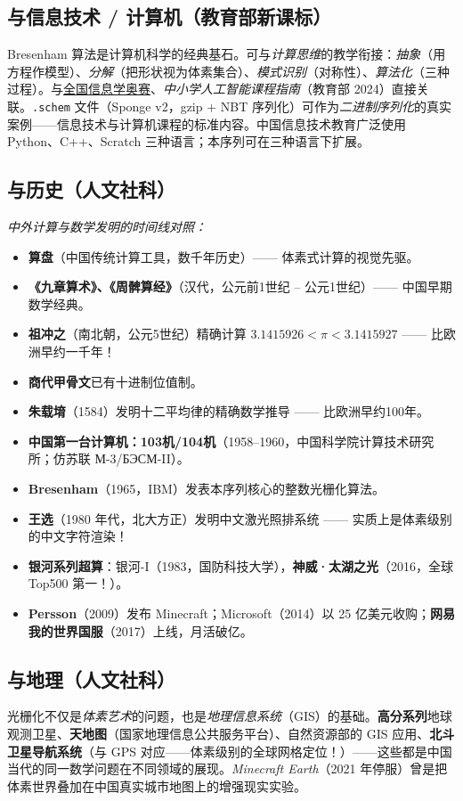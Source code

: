 \documentclass[12pt,a4paper]{scrartcl}
\newcommand{\acc}[1]{\textcolor{accent}{\textbf{#1}}}
\begin{document}
\subsection{与信息技术 / 计算机（教育部新课标）}
Bresenham 算法是计算机科学的经典基石。可与\emph{计算思维}的教学衔接：\emph{抽象}（用方程作模型）、\emph{分解}（把形状视为体素集合）、\emph{模式识别}（对称性）、\emph{算法化}（三种过程）。与\hyperref[sec:obmep]{全国信息学奥赛}、\emph{中小学人工智能课程指南}（教育部 2024）直接关联。\texttt{.schem} 文件（Sponge v2，gzip + NBT 序列化）可作为\emph{二进制序列化}的真实案例——信息技术与计算机课程的标准内容。中国信息技术教育广泛使用 Python、C++、Scratch 三种语言；本序列可在三种语言下扩展。

\subsection{与历史（人文社科）}
\emph{中外计算与数学发明的时间线对照：}
\begin{itemize}[leftmargin=1.3em,itemsep=0.15em,topsep=0.3em,nosep]
  \item \acc{算盘}（中国传统计算工具，数千年历史）—— 体素式计算的视觉先驱。
  \item \acc{《九章算术》、《周髀算经》}（汉代，公元前1世纪 -- 公元1世纪）—— 中国早期数学经典。
  \item \acc{祖冲之}（南北朝，公元5世纪）精确计算 $3.1415926 < \pi < 3.1415927$ —— 比欧洲早约一千年！
  \item \acc{商代甲骨文}已有十进制位值制。
  \item \acc{朱载堉}（1584）发明十二平均律的精确数学推导 —— 比欧洲早约100年。
  \item \acc{中国第一台计算机：103机/104机}（1958--1960，中国科学院计算技术研究所；仿苏联 М-3/БЭСМ-II）。
  \item \acc{Bresenham}（1965，IBM）发表本序列核心的整数光栅化算法。
  \item \acc{王选}（1980 年代，北大方正）发明中文激光照排系统 —— 实质上是体素级别的中文字符渲染！
  \item \acc{银河系列超算}：银河-I（1983，国防科技大学），\acc{神威·太湖之光}（2016，全球 Top500 第一！）。
  \item \acc{Persson}（2009）发布 Minecraft；Microsoft（2014）以 25 亿美元收购；\acc{网易我的世界国服}（2017）上线，月活破亿。
\end{itemize}

\subsection{与地理（人文社科）}
光栅化不仅是\emph{体素艺术}的问题，也是\emph{地理信息系统}（GIS）的基础。\acc{高分系列}地球观测卫星、\acc{天地图}（国家地理信息公共服务平台）、自然资源部的 GIS 应用、\acc{北斗卫星导航系统}（与 GPS 对应——体素级别的全球网格定位！）——这些都是中国当代的同一数学问题在不同领域的展现。\emph{Minecraft Earth}（2021 年停服）曾是把体素世界叠加在中国真实城市地图上的增强现实实验。
\end{document}
